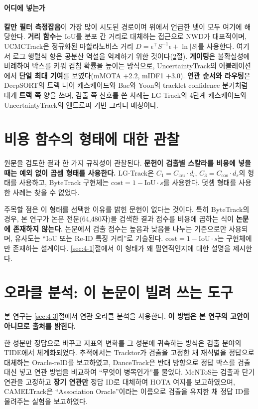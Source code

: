 \documentclass[12pt,a4paper,oneside]{report}
\begin{document}
\paragraph{어디에 넣는가} \textbf{칼만 필터 측정잡음}이 가장 많이 시도된 경로이며 위에서 언급한 넷이 모두 여기에 해당한다. \textbf{거리 함수}는 IoU를 분포 간 거리로 대체하는 접근으로 NWD가 대표적이며, UCMCTrack은 정규화된 마할라노비스 거리 $D = \epsilon^\top S^{-1} \epsilon + \ln|S|$를 사용한다. 여기서 로그 행렬식 항은 공분산 역설을 억제하기 위한 것이다(\ref{sec:2-4}절). \textbf{게이팅}은 불확실성에 비례하여 박스를 키워 겹침 확률을 높이는 방식으로, UncertaintyTrack의 어블레이션에서 \textbf{단일 최대 기여}를 보였다(mMOTA $+2.2$, mIDF1 $+3.0$). \textbf{연관 순서와 라우팅}은 DeepSORT의 트랙 나이 캐스케이드와 Bae와 Yoon\citep{bae2014}의 tracklet confidence 분기처럼 대개 \textbf{트랙 쪽} 양을 쓰며, 검출 쪽 신호를 쓴 사례는 LG-Track\citep{meng2023}의 4단계 캐스케이드와 UncertaintyTrack의 엔트로피 기반 그리디 매칭이다.

\section{비용 함수의 형태에 대한 관찰}\label{sec:2-3}

원문을 검토한 결과 한 가지 규칙성이 관찰된다. \textbf{문헌이 검출별 스칼라를 비용에 넣을 때는 예외 없이 곱셈 형태를 사용한다.} LG-Track은 $C_1 = C_{\mathrm{iou}} \cdot d_l$, $C_3 = C_{\cos} \cdot d_s$의 형태를 사용하고, ByteTrack 구현체는 $\mathrm{cost} = 1 - \mathrm{IoU} \cdot s$를 사용한다. 덧셈 형태를 사용한 사례는 찾을 수 없었다.

주목할 점은 이 형태를 선택한 이유를 밝힌 문헌이 없다는 것이다. 특히 ByteTrack의 경우, 본 연구가 논문 전문(64{,}480자)을 검색한 결과 점수를 비용에 곱하는 식이 \textbf{논문에 존재하지 않는다}. 논문에서 검출 점수는 높음과 낮음을 나누는 기준으로만 사용되며, 유사도는 ``IoU 또는 Re-ID 특징 거리''로 기술된다. $\mathrm{cost} = 1 - \mathrm{IoU} \cdot s$는 구현체에만 존재하는 설계이다. \ref{sec:4-1}절에서 이 형태가 왜 필연적인지에 대한 설명을 제시한다.

\section{오라클 분석: 이 논문이 빌려 쓰는 도구}\label{sec:2-4}

본 연구는 \ref{sec:4-3}절에서 연관 오라클 분석을 사용한다. \textbf{이 방법은 본 연구의 고안이 아니므로 출처를 밝힌다.}

한 성분만 정답으로 바꾸고 지표의 변화를 그 성분에 귀속하는 방식은 검출 분야의 TIDE\citep{bolya2020}에서 체계화되었다. 추적에서는 Tracktor\citep{bergmann2019}가 검출을 고정한 채 재식별을 정답으로 대체하는 Oracle-reID를 보고하였고, DanceTrack\citep{sun2022}은 반대 방향으로 정답 박스를 검출 대신 넣고 연관 방법을 비교하여 ``무엇이 병목인가''를 물었다. MeNToS\citep{miah2023}는 검출과 단기 연관을 고정하고 \textbf{장기 연관만} 정답 ID로 대체하여 HOTA 여지를 보고하였으며, CAMELTrack\citep{somers2025}은 ``Association Oracle''이라는 이름으로 검출을 유지한 채 정답 ID를 물려주는 실험을 보고하였다.
\end{document}
